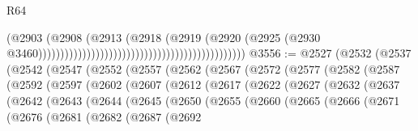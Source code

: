 \begin{lexlean}{R64}
\begin{coremodule}
                                                                                  (@2903
                                                                                    (@2908
                                                                                      (@2913
                                                                                        (@2918
                                                                                          (@2919
                                                                                            (@2920
                                                                                              (@2925
                                                                                                (@2930
                                                                                                  @3460)))))))))))))))))))))))))))))))))))))))))))))))
@3556 := @2527
    (@2532
      (@2537
        (@2542
          (@2547
            (@2552
              (@2557
                (@2562
                  (@2567
                    (@2572
                      (@2577
                        (@2582
                          (@2587
                            (@2592
                              (@2597
                                (@2602
                                  (@2607
                                    (@2612
                                      (@2617
                                        (@2622
                                          (@2627
                                            (@2632
                                              (@2637
                                                (@2642
                                                  (@2643
                                                    (@2644
                                                      (@2645
                                                        (@2650
                                                          (@2655
                                                            (@2660
                                                              (@2665
                                                                (@2666
                                                                  (@2671
                                                                    (@2676
                                                                      (@2681
                                                                        (@2682
                                                                          (@2687
                                                                            (@2692

\end{coremodule}
\end{lexlean}
